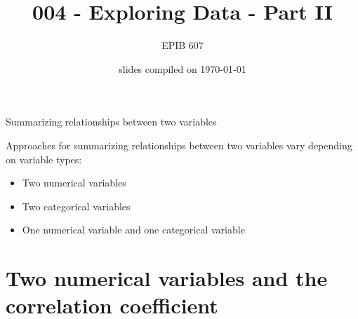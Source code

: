 \documentclass[10pt,handout]{beamer}\usepackage[]{graphicx}\usepackage[]{color}
\begin{document}
	
	
	
	
	\title{004 - Exploring Data - Part II}
	\author{EPIB 607}
	
	\date{slides compiled on \today}
	
	\maketitle

	
	

						
\begin{frame}{Summarizing relationships between two variables}
							\protect\hypertarget{summarizing-relationships-between-two-variables}{}
							
							Approaches for summarizing relationships between two variables vary
							depending on variable types:
							
							\begin{itemize}
								\item
								Two numerical variables
								\item
								Two categorical variables
								\item
								One numerical variable and one categorical variable
							\end{itemize}
							
\end{frame}


\section{Two numerical variables and the correlation coefficient}
\end{document}
